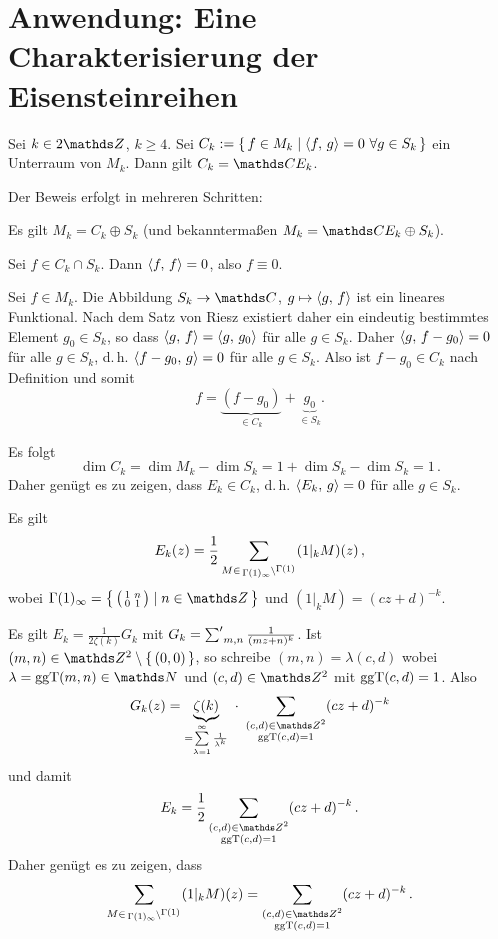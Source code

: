 \section{Anwendung: Eine Charakterisierung der Eisensteinreihen}

\begin{satz}\label{CharEk}
	Sei $k \in 2\ZZ$, $k \geq 4$. Sei $C_k := \Set{f \in M_k \mid \scalarprd{f}{g} = 0 \ \forall g \in S_k}$ ein Unterraum von $M_k$.
	Dann gilt $C_k = \CC E_k$.
\end{satz}


\begin{bewe}

	Der Beweis erfolgt in mehreren Schritten:
	\vspace{-2em}

\begin{lemm}
	Es gilt $M_k = C_k \oplus S_k$ (und bekanntermaßen $M_k = \CC E_k \oplus S_k$).
\end{lemm}

\begin{bewe}
	Sei $f \in C_k \cap S_k$. Dann $\scalarprd ff = 0$, also $f \equiv 0$.
	
	Sei $f \in M_k$.
	Die Abbildung $S_k \ra \CC$, $g \mapsto \scalarprd gf$ ist ein lineares Funktional.
	Nach dem Satz von Riesz existiert daher ein eindeutig bestimmtes Element $g_0 \in S_k$, so dass $\scalarprd gf = \scalarprd g{g_0}$ für alle $g \in S_k$.
	Daher $\scalarprd g{f-g_0} = 0$ für alle $g\in S_k$, d.\,h. $\scalarprd {f-g_0}g = 0$ für alle $g \in S_k$.
	Also ist $f-g_0 \in C_k$ nach Definition und somit
	\[
		f = \underbrace{(f-g_0)}_{\in C_k} + \underbrace{g_0}_{\in S_k} .
	\]
\end{bewe}

Es folgt
\[
	\dim C_k = \dim M_k - \dim S_k = 1 + \dim S_k - \dim S_k = 1\,.
\]
Daher genügt es zu zeigen, dass $E_k \in C_k$, d.\,h. $\scalarprd{E_k}g = 0$ für alle $g \in S_k$.

\begin{lemm}\label{Ek_per_Gamma(1)infty}
	Es gilt
	\[
		E_k(z) = \frac{1}{2} \sum_{M \in \linksmodulo{\Gamma(1)_\infty}{\Gamma(1)}} (1|_k M)(z)\,,
	\]
	wobei $\Gamma(1)_\infty = \Set{\mymat 1n01 \mid n \in \ZZ}$ und $(1|_k M) = (cz+d)^{-k}$.
\end{lemm}

\begin{bewe}
	Es gilt $E_k = \frac{1}{2\zeta(k)} G_k$ mit $G_k = \sumprime_{m,n} \frac{1}{(mz+n)^k}$.
	Ist $(m,n) \in \ZZ^2\setminus\Set{(0,0)}$, so schreibe $(m,n) = \lambda (c,d)$ wobei $\lambda = \ggt(m,n) \in \NN$ und $(c,d) \in \ZZ^2$ mit $\operatorname{ggT}(c,d) = 1$.
	Also
	\[
		G_k(z)
		= \underbrace{\zeta(k)}_{= \sum\limits_{\lambda=1}^\infty \frac{1}{\lambda^k}}\ \cdot\ \sum_{\substack{(c,d) \in \ZZ^2 \\ \ggt(c,d) = 1}} (cz+d)^{-k}
	\]
	und damit
	\[
		E_k = \frac{1}{2} \sum_{\substack{(c,d) \in \ZZ^2 \\ \ggt(c,d) = 1}} (cz+d)^{-k}
		\,.
	\]
	Daher genügt es zu zeigen, dass
	\[
		\sum_{M \in \linksmodulo{\Gamma(1)_\infty}{\Gamma(1)}} (1|_k M)(z)
		= \sum_{\substack{(c,d) \in \ZZ^2 \\ \ggt(c,d) = 1}} (cz+d)^{-k}
		\,.
	\]
	

\end{bewe}
\end{bewe}
